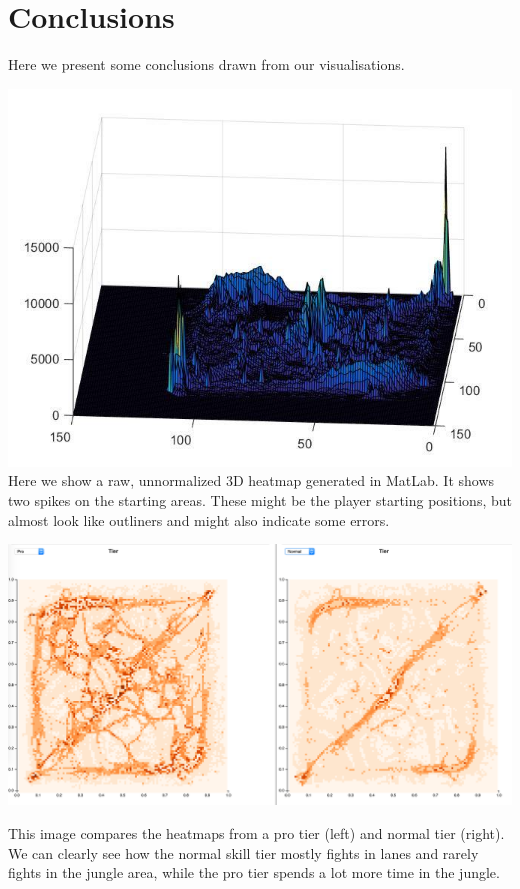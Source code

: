 \section{Conclusions}

Here we present some conclusions drawn from our visualisations.

\includegraphics[width=\textwidth]{HM3D}
Here we show a raw, unnormalized 3D heatmap generated in MatLab. It shows two spikes on the starting areas. These might be the player starting positions, but almost look like outliners and might also indicate some errors.

\includegraphics[width=\textwidth]{HM_tiers}

This image compares the heatmaps from a pro tier (left) and normal tier (right). We can clearly see how the normal skill tier mostly fights in lanes and rarely fights in the jungle area, while the pro tier spends a lot more time in the jungle.

